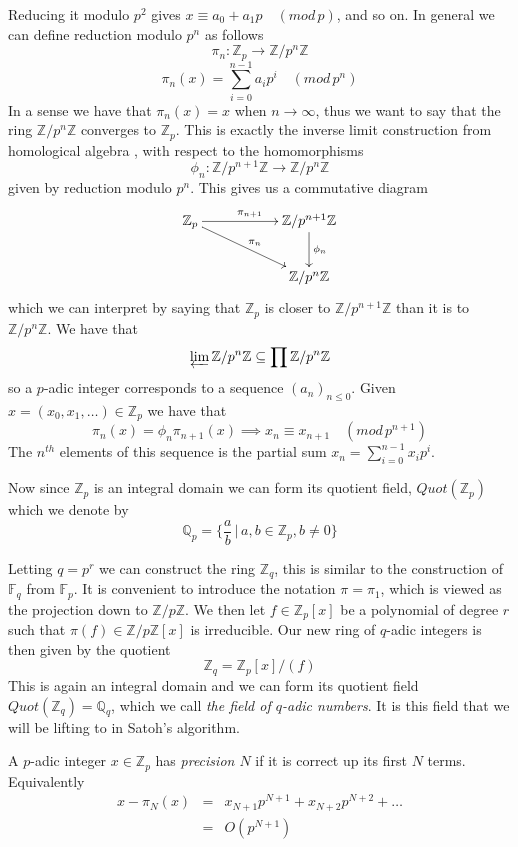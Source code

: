 Reducing it modulo $p^2$ gives $x \equiv a_0 + a_1p \quad (mod\, p)$, and so on. In general
we can define reduction modulo $p^n$ as follows
$$\pi_n: \mathbb{Z}_p \rightarrow \mathbb{Z}/p^n\mathbb{Z}$$
$$\pi_n(x) = \sum_{i=0}^{n-1} a_i p^i \quad (mod\, p^n) $$
In a sense we have that $\pi_n(x) = x$ when $n \rightarrow \infty$, thus we want to say that the ring
$\mathbb{Z}/p^n\mathbb{Z}$ converges to $\mathbb{Z}_p$. This is exactly the inverse
limit construction from homological algebra \cite{Rotman}, with respect to the homomorphisms
$$\phi_n: \mathbb{Z}/p^{n+1}\mathbb{Z} \rightarrow \mathbb{Z}/p^n\mathbb{Z} $$
given by reduction modulo $p^n$. This gives us a commutative diagram
$$
\xymatrix {
  \mathbb{Z}_p \ar[rr]^{\pi_{n+1}} \ar[drr]^{\pi_n} & & \mathbb{Z}/p^{n+1}\mathbb{Z} \ar[d]^{\phi_n} \\
  & & \mathbb{Z}/p^n\mathbb{Z}
}
$$
which we can interpret by saying that $\mathbb{Z}_p$ is closer to $\mathbb{Z}/p^{n+1}\mathbb{Z}$ than it is to
$\mathbb{Z}/p^n\mathbb{Z}$. We have that
$$\varprojlim \mathbb{Z}/p^n\mathbb{Z} \subseteq \prod \mathbb{Z}/p^n\mathbb{Z}$$ so a $p$-adic
integer corresponds to a sequence $(a_n)_{n\leq0}$.
Given $x=(x_0, x_1, \ldots) \in \mathbb{Z}_p$ we have that 
$$\pi_n(x) = \phi_n\pi_{n+1}(x) \implies x_n \equiv x_{n+1} \quad (mod\, p^{n+1})$$
The $n^{th}$ elements of this sequence is the partial sum $x_n = \sum_{i=0}^{n-1} x_i p^i$.

Now since $\mathbb{Z}_p$ is an integral domain we can form its quotient field, $Quot(\mathbb{Z}_p)$
which we denote by
$$\mathbb{Q}_p = \{\frac{a}{b}\, |\, a,b \in \mathbb{Z}_p, b\neq 0\}$$ 

Letting $q=p^r$ we can construct the ring $\mathbb{Z}_q$, this is similar to the construction
of $\mathbb{F}_q$ from $\mathbb{F}_p$. It is convenient to introduce the notation
$\pi=\pi_1$, which is viewed as the projection down to $\mathbb{Z}/p\mathbb{Z}$.
We then let $f \in \mathbb{Z}_p[x]$ be a polynomial
of degree $r$ such that $\pi(f) \in \mathbb{Z}/p\mathbb{Z}[x]$ is irreducible.
Our new ring of $q$-adic integers is then given by the quotient
$$\mathbb{Z}_q = \mathbb{Z}_p[x]/(f) $$
This is again an integral domain  and we can form its quotient field $Quot(\mathbb{Z}_q) = \mathbb{Q}_q$,
which we call \emph{the field of $q$-adic numbers}. It is this field that we will
be lifting to in Satoh's algorithm.

\begin{mydef}
 A $p$-adic integer $x\in \mathbb{Z}_p$ has \emph{precision $N$} if it is correct up its first $N$ terms.
Equivalently 
\begin{eqnarray}
  x-\pi_N(x) &=& x_{N+1}p^{N+1} + x_{N+2}p^{N+2} + \ldots \nonumber \\
	     &=& O(p^{N+1}) \nonumber
\end{eqnarray}

\end{mydef}
